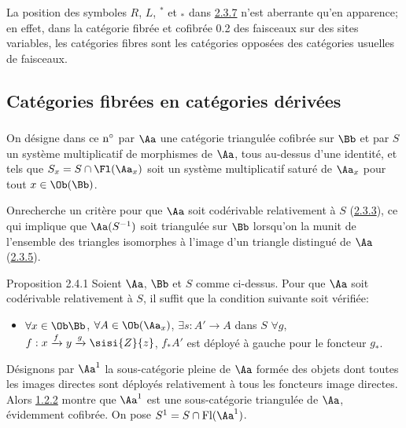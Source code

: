 \documentclass[10pt]{../fichiers-configuration-latex/smfart}
\begin{document}
La position des symboles $R$, $L$, ${}^\ast$ et ${}_{\ast}$ dans \hyperref[XVII.thm2.3.7]{2.3.7}
n'est aberrante qu'en apparence; en effet, dans la catégorie fibrée et
cofibrée 0.2 des faisceaux sur des sites variables, les catégories
fibres sont les catégories opposées des catégories usuelles de
faisceaux.

\subsection{Catégories fibrées en catégories dérivées}

\setcounter{subsubsection}{-1}
\subsubsection{}
On désigne dans ce ${\rm n^{\circ}}$ par $\Aa$ une catégorie
triangulée cofibrée sur $\Bb$ et par $S$ un système
multiplicatif de morphismes de $\Aa$, tous au-dessus d'une
identité, et tels que $S_x=S\cap \Fl(\Aa_x)$ soit un système
multiplicatif saturé de $\Aa_x$ \cite[1.2.1]{SGA4-17:CD} pour tout
$x\in \Ob (\Bb)$.

On\pageoriginale recherche un critère pour que $\Aa$ soit
codérivable relativement à $S$ (\hyperref[XVII.def2.3.3]{2.3.3}), ce qui implique que
$\Aa(S^{-1})$ soit triangulée sur $\Bb$ lorsqu'on la
munit de l'ensemble des triangles isomorphes à l'image d'un triangle
distingué de $\Aa$ (\hyperref[XVII.prop2.3.5]{2.3.5}).

\begin{enonce*}{Proposition 2.4.1}
Soient $\Aa$, $\Bb$ et $S$ comme ci-dessus. Pour que
$\Aa$ soit codérivable relativement à $S$, il suffit que la
condition suivante soit vérifiée:
\begin{itemize}
\item[$(\ast)$] $\forall x \in \Ob\Bb$, $\forall A\in
\Ob(\Aa_x)$, $\exists s:A'\rightarrow A$ dans $S$\sisi{}{,} $\forall g$,
$f:x\xrightarrow{f}y\xrightarrow{g}\sisi{Z}{z}$, $f_{\ast}A'$ est déployé à
gauche pour le foncteur $g_{\ast}$.
\end{itemize}
\end{enonce*}

Désignons par $\Aa^{1}$ la sous-catégorie pleine de
$\Aa$ formée des objets dont toutes les images directes sont
déployés relativement à tous les foncteurs image directes. Alors \hyperref[XVII.prop1.2.2]{1.2.2}
montre que $\Aa^{1}$ est une sous-catégorie triangulée de
$\Aa$, évidemment cofibrée. On pose $S^{1}=S\cap \text{Fl}
(\Aa^{1})$.
\end{document}
